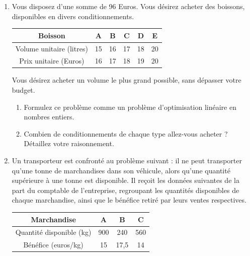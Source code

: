 \begin{enumerate}
    \begin{solution}
      \nosolution
    \end{solution}

  \item Vous disposez d'une somme de 96 Euros. Vous désirez acheter
    des boissons, disponibles en divers conditionnements.
    \begin{center}
      \begin{tabular}{|c|c|c|c|c|c|}
        \hline %
        Boisson & A & B & C & D & E\\
        \hline
        Volume unitaire (litres) & 15 & 16 & 17 & 18 & 20\\
        \hline
        Prix unitaire (Euros) & 16 & 17 & 18 & 19 & 20\\
        \hline
      \end{tabular}
    \end{center}
    Vous désirez acheter un volume le plus grand possible, sans
    dépasser votre budget.
    \begin{enumerate}
      \item Formulez ce problème comme un problème d'optimisation
        linéaire en nombres entiers.
      \item Combien de conditionnements de chaque type allez-vous acheter
        ? Détaillez votre raisonnement.
    \end{enumerate}

    \begin{solution}
      \nosolution
    \end{solution}

  \item Un transporteur est confronté au problème suivant : il ne
    peut transporter qu'une tonne de marchandises dans son véhicule,
    alors qu'une quantité supérieure à une tonne est disponible. Il
    reçoit les données suivantes de la part du comptable de
    l'entreprise, regroupant les quantités disponibles de chaque
    marchandise, ainsi que le bénéfice retiré par leurs ventes
    respectives.

    \begin{center}
      \begin{tabular}{|c|c|c|c|}
        \hline %
        Marchandise & A & B & C\\
        \hline
        Quantité disponible (kg) & 900 & 240 & 560 \\
        \hline
        Bénéfice (euros/kg) & 15 & 17,5 & 14 \\
        \hline
      \end{tabular}
    \end{center}


\end{enumerate}
